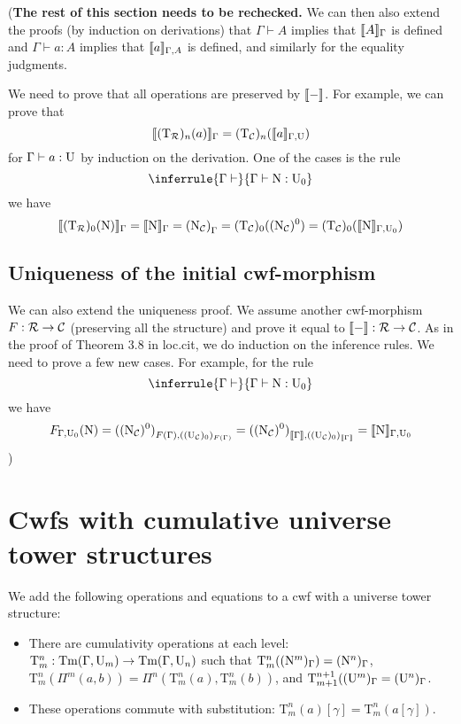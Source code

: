 \documentclass{lmcs}
\newcommand{\Ta}{\mathrm{T}}
\newcommand{\Ru}{\mathcal{R}}
\newcommand{\Un}{\U_n}
\newcommand{\TRu}{\Ta_\Ru}
\newcommand{\PiRu}{\Pi_\Ru}
\newcommand{\TC}{\Ta_\C}
\newcommand{\UC}{\U_\C}
\newcommand{\NC}{\N_\C}
\newcommand{\PiC}{\Pi_\C}
\begin{document}
({\bf The rest of this section needs to be rechecked.}
We can then also extend the proofs (by induction on derivations) that $\Gamma \vdash A$ implies that $\llbracket A \rrbracket_\Gamma$ is defined and $\Gamma \vdash a : A$ implies that $\llbracket a \rrbracket_{\Gamma,A}$ is defined, and similarly for the equality judgments. 

We need to prove that all operations are preserved by $\llbracket - \rrbracket$. For example, we can prove that 
$$
\inte{(\TRu)_n(a)}_\Gamma = (\TC)_n(\inte{a}_{\Gamma,\U})
$$
for $\Gamma \vdash a : \mathrm{U}$ by induction on the derivation.
One of the cases is the rule
$$
\inferrule
		{\Gamma \vdash} 
		{\Gamma \vdash \N : \U_0}
$$
we have
$$
\inte{(\Ta_\Ru)_0(\N)}_\Gamma = \inte{\N}_\Gamma = {(\N_\C)}_\Gamma = (\Ta_\C)_0((\NC)^0) = (\Ta_\C)_0(\inte{\N}_{\Gamma,\U_0})
$$

\subsection{Uniqueness of the initial cwf-morphism}

We can also extend the uniqueness proof. We assume another cwf-morphism $F : \Ru \to \C$ (preserving all the structure) and prove it equal to $\inte{-} : \Ru \to \C$. As in the proof of Theorem 3.8 in loc.cit, we do induction on the inference rules. We need to prove a few new cases. For example, for the rule
$$
\inferrule
		{\Gamma \vdash} 
		{\Gamma \vdash \N : \U_0}
$$
we have
$$
F_{\Gamma,\U_0}(\N) =  {({({\NC})^0})}_{F(\Gamma),((\UC)_0)_{F(\Gamma)}} =  {({({\NC})^0})}_{\inte{\Gamma},((\UC)_0)_{\inte{\Gamma}}} = \inte{\N}_{\Gamma,\U_0}
$$
)
\section{Cwfs with cumulative universe tower structures}

We add the following operations and equations to a cwf with a universe tower structure:
\newline
\begin{itemize}
\item 
There are cumulativity operations at each level: $\Ta^n_m : \Tm(\Gamma,\U_m) \to \Tm(\Gamma,\U_n)$ such that
$\Ta^n_m((\N^m)_\Gamma) = (\N^n)_\Gamma$, $\Ta^{n}_m(\Pi^m(a,b)) = \Pi^{n}(\Ta^{n}_m(a),\Ta^{n}_m(b))$, and $\Ta^{n+1}_{m+1}((\U^m)_\Gamma = (\U^{n})_\Gamma$.
\item
These operations commute with substitution:
$\Ta^n_m(a)[\gamma]  = \Ta^n_m(a[\gamma])$.
\end{itemize}
\end{document}
